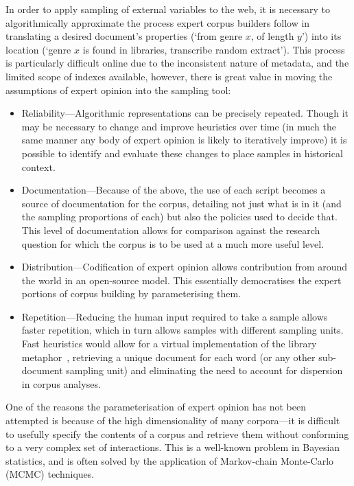 In order to apply sampling of external variables to the web, it is necessary to algorithmically approximate the process expert corpus builders follow in translating a desired document's properties (`from genre $x$, of length $y$') into its location (`genre $x$ is found in libraries, transcribe random extract').  This process is particularly difficult online due to the inconsistent nature of metadata, and the limited scope of indexes available, however, there is great value in moving the assumptions of expert opinion into the sampling tool:

\begin{itemize}
    \item Reliability---Algorithmic representations can be precisely repeated.  Though it may be necessary to change and improve heuristics over time (in much the same manner any body of expert opinion is likely to iteratively improve) it is possible to identify and evaluate these changes to place samples in historical context.
    \item Documentation---Because of the above, the use of each script becomes a source of documentation for the corpus, detailing not just what is in it (and the sampling proportions of each) but also the policies used to decide that.  This level of documentation allows for comparison against the research question for which the corpus is to be used at a much more useful level.
    \item Distribution---Codification of expert opinion allows contribution from around the world in an open-source model.  This essentially democratises the expert portions of corpus building by parameterising them.
    \item Repetition---Reducing the human input required to take a sample allows faster repetition, which in turn allows samples with different sampling units.  Fast heuristics would allow for a virtual implementation of the library metaphor~\cite{evert2006random}, retrieving a unique document for each word (or any other sub-document sampling unit) and eliminating the need to account for dispersion in corpus analyses.
\end{itemize}


One of the reasons the parameterisation of expert opinion has not been attempted is because of the high dimensionality of many corpora---it is difficult to usefully specify the contents of a corpus and retrieve them without conforming to a very complex set of interactions.  This is a well-known problem in Bayesian statistics, and is often solved by the application of Markov-chain Monte-Carlo (MCMC) techniques.

